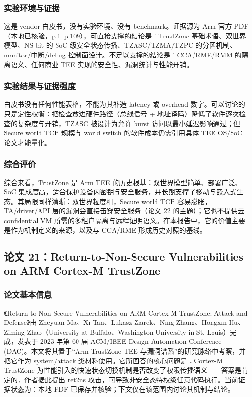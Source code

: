 \documentclass[11pt]{ctexart}
\begin{document}
\subsubsection{实验环境与证据}
这是 vendor 白皮书，没有实验环境、没有 benchmark。证据源为 Arm 官方 PDF（本地已核验，p.1--p.109），可直接支撑的结论是：TrustZone 基础术语、双世界模型、NS bit 的 SoC 级安全状态传播、TZASC/TZMA/TZPC 的分区机制、monitor/中断/debug 控制面设计。不足以支撑的结论是：CCA/RME/RMM 的隔离语义、任何商业 TEE 实现的安全性、漏洞统计与性能开销。\par
\subsubsection{实验结果与证据强度}
白皮书没有任何性能表格，不能为其补造 latency 或 overhead 数字。可以讨论的只是定性权衡：把检查放进硬件路径（总线信号 + 地址译码）降低了软件逐次检查的复杂度与开销，TZASC 被设计为允许 burst 访问以最小延迟影响通过；但 Secure world TCB 规模与 world switch 的软件成本仍需引用具体 TEE OS/SoC 论文才能量化。\par
\subsubsection{综合评价}
综合来看，TrustZone 是 Arm TEE 的历史根基：双世界模型简单、部署广泛、SoC 集成度高，适合保护设备内密钥与安全服务，并长期支撑了移动与嵌入式生态。其局限同样清晰：双世界粒度粗，Secure world TCB 容易膨胀，TA/driver/API 层的漏洞会直接击穿安全服务（论文 22 的主题）；它也不提供云 confidential VM 所需的多租户隔离与远程证明语义。在本报告中，它的价值主要是作为机制定义的来源，以及与 CCA/RME 形成历史对照的基线。\par

\subsection{论文 21：Return-to-Non-Secure Vulnerabilities on ARM Cortex-M TrustZone}
\subsubsection{论文基本信息}
《Return-to-Non-Secure Vulnerabilities on ARM Cortex-M TrustZone: Attack and Defense》由 Zheyuan Ma、Xi Tan、Lukasz Ziarek、Ning Zhang、Hongxin Hu、Ziming Zhao（University at Buffalo、Washington University in St. Louis）完成，发表于 2023 年第 60 届 ACM/IEEE Design Automation Conference (DAC)。本文将其置于``Arm TrustZone TEE 与漏洞谱系''的研究脉络中考察，并把它作为 system/attack 类材料使用。它所回答的核心问题是：Cortex-M TrustZone 为性能引入的快速状态切换机制是否改变了权限传播语义——答案是肯定的，作者据此提出 ret2ns 攻击，可导致非安全态特权级任意代码执行。当前证据状态为：本地 PDF 已保存并核验；下文仅在该范围内讨论其机制与结论。\cite{ma2023ret2ns}\par
\end{document}

